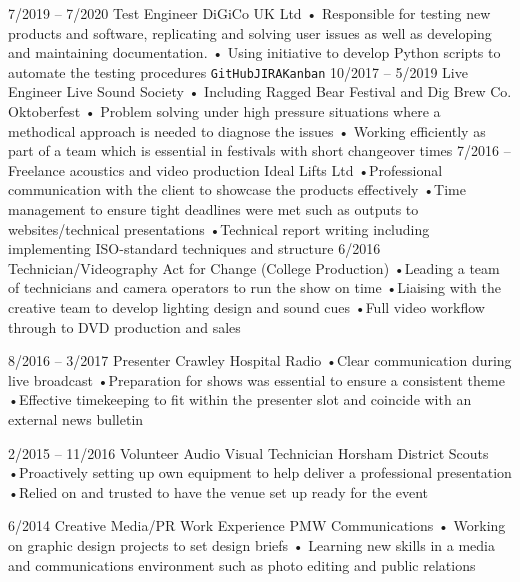 \documentclass[9pt]{developercv} %
\begin{document}
\begin{entrylist}
	\entry
		{7/2019 -- 7/2020}
		{Test Engineer}
		{DiGiCo UK Ltd}
		{• Responsible for testing new products and software, replicating and solving user issues as well as developing and maintaining documentation. \newline • Using initiative to develop Python scripts to automate the testing procedures \newline \texttt{GitHub}\slashsep\texttt{JIRA}\slashsep\texttt{Kanban}}
		\entry
		{10/2017 -- 5/2019}
		{Live Engineer}
		{Live Sound Society}
		{• Including Ragged Bear Festival and Dig Brew Co. Oktoberfest \newline• Problem solving under high pressure situations where a methodical approach is needed to diagnose the issues
\newline• Working efficiently as part of a team which is essential in festivals with short changeover times}
\entry
		{7/2016 -- }
		{Freelance acoustics and video production}
		{Ideal Lifts Ltd}
		{•Professional communication with the client to showcase the products effectively
\newline•Time management to ensure tight deadlines were met such as outputs to websites/technical presentations
\newline•Technical report writing including implementing ISO-standard techniques and structure}
\entry
		{6/2016}
		{Technician/Videography}
		{Act for Change  (College Production)}
		{•Leading a team of technicians and camera operators to run the show on time
\newline•Liaising with the creative team to develop lighting design and sound cues
\newline•Full video workflow through to DVD production and sales}

\entry
		{8/2016 -- 3/2017}
		{Presenter}
		{Crawley Hospital Radio}
		{•Clear communication during live broadcast
\newline•Preparation for shows was essential to ensure a consistent theme
\newline•Effective timekeeping to fit within the presenter slot and coincide with an external news bulletin}

\entry
		{2/2015 -- 11/2016}
		{Volunteer Audio Visual Technician}
		{Horsham District Scouts}
		{•Proactively setting up own equipment to help deliver a professional presentation
\newline•Relied on and trusted to have the venue set up ready for the event}

\entry
		{6/2014}
		{Creative Media/PR Work Experience}
		{PMW Communications}
		{• Working on graphic design projects to set design briefs
\newline• Learning new skills in a media and communications environment such as photo editing and public relations}


\end{entrylist}
\end{document}
